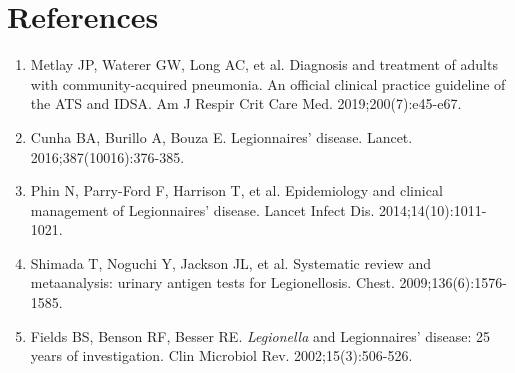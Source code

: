 \section*{References}
\begin{enumerate}
  \item Metlay JP, Waterer GW, Long AC, et al. Diagnosis and treatment of adults with community-acquired pneumonia. An official clinical practice guideline of the ATS and IDSA. Am J Respir Crit Care Med. 2019;200(7):e45-e67.
  \item Cunha BA, Burillo A, Bouza E. Legionnaires' disease. Lancet. 2016;387(10016):376-385.
  \item Phin N, Parry-Ford F, Harrison T, et al. Epidemiology and clinical management of Legionnaires' disease. Lancet Infect Dis. 2014;14(10):1011-1021.
  \item Shimada T, Noguchi Y, Jackson JL, et al. Systematic review and metaanalysis: urinary antigen tests for Legionellosis. Chest. 2009;136(6):1576-1585.
  \item Fields BS, Benson RF, Besser RE. \textit{Legionella} and Legionnaires' disease: 25 years of investigation. Clin Microbiol Rev. 2002;15(3):506-526.
\end{enumerate}

\clearpage
